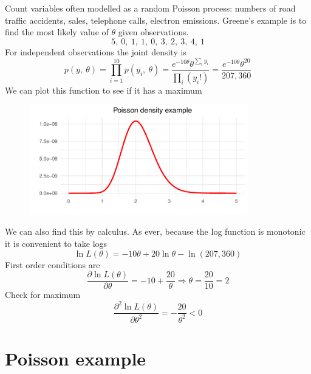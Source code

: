 \documentclass[
  letterpaper,
]{book}
\begin{document}
Count variables often modelled as a random Poisson process: numbers of
road traffic accidents, sales, telephone calls, electron emissions.
Greene's example is to find the most likely value of \(\theta\) given
observations. \begin{equation}
5,\ 0,\ 1,\ 1,\ 0,\ 3,\ 2,\ 3,\ 4,\ 1
\end{equation} For independent observations the joint density is
\begin{equation}
p(y,\ \theta) =\prod_{i=1}^{10}p(y_i,\ \theta )
  = \frac{e^{-10\theta}\theta^{\sum_i y_i}}{\prod_i (y_i!)}
  = \frac{e^{-10\theta}\theta^{20}}{207,360}
\end{equation} We can plot this function to see if it has a maximum

\begin{figure}

{\centering \includegraphics[width=0.85\textwidth,height=\textheight]{CK_files/figure-pdf/dens-1.pdf}

}

\end{figure}

We can also find this by calculus. As ever, because the log function is
monotonic it is convenient to take logs \begin{equation}
   \ln L(\theta) = -10\theta + 20\ln\theta -\ln(207,360)
\end{equation} First order conditions are \begin{equation}
  \frac{\partial \ln L(\theta )}{\partial\theta} = -10+\frac{20}{\theta}
\Rightarrow \theta =\frac{20}{10}=2
\end{equation} Check for maximum \begin{equation}
   \frac{\partial^2\ln L(\theta )}{\partial\theta^2} = -\frac{20}{\theta^2} < 0
\end{equation}

\hypertarget{poisson-example-1}{%
\section{Poisson example}\label{poisson-example-1}}
\end{document}
